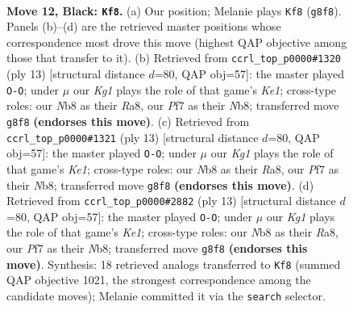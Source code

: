 \documentclass[11pt]{article}
\begin{document}
\clearpage

\begin{figure}[p]\centering
\begin{subfigure}{0.46\textwidth}\centering
\resizebox{\linewidth}{!}{%
\newchessgame
\chessboard[
  setfen={rnb1r1k1/pp1qnppp/4p2P/2PpP3/5PP1/P1P5/2P5/R1BQKBNR b KQ - 0 12},
  showmover=false,
  pgfstyle=straightmove, color=movearrow, markmove={g8-f8}
]}
\caption{}
\end{subfigure}\hfill
\begin{subfigure}{0.46\textwidth}\centering
\resizebox{\linewidth}{!}{%
\newchessgame
\chessboard[
  setfen={rnbqk2r/pp2nppp/4p3/2ppP3/3P2Q1/P1P5/2P2PPP/R1B1KBNR b KQkq - 2 7},
  showmover=false,
  pgfstyle=straightmove, color=movearrow, markmove={e8-g8}
]}
\caption{}
\end{subfigure}
\\[4pt]
\begin{subfigure}{0.46\textwidth}\centering
\resizebox{\linewidth}{!}{%
\newchessgame
\chessboard[
  setfen={rnbqk2r/pp2nppp/4p3/2ppP3/3P2Q1/P1P5/2P2PPP/R1B1KBNR b KQkq - 2 7},
  showmover=false,
  pgfstyle=straightmove, color=movearrow, markmove={e8-g8}
]}
\caption{}
\end{subfigure}\hfill
\begin{subfigure}{0.46\textwidth}\centering
\resizebox{\linewidth}{!}{%
\newchessgame
\chessboard[
  setfen={rnbqk2r/pp2nppp/4p3/2ppP3/3P2Q1/P1P5/2P2PPP/R1B1KBNR b KQkq - 2 7},
  showmover=false,
  pgfstyle=straightmove, color=movearrow, markmove={e8-g8}
]}
\caption{}
\end{subfigure}
\caption{\textbf{Move 12, Black: \texttt{Kf8}.} (a) Our position; Melanie plays \texttt{Kf8} (\texttt{g8f8}). Panels (b)--(d) are the retrieved master positions whose correspondence most drove this move (highest QAP objective among those that transfer to it). (b) Retrieved from \texttt{ccrl\_top\_p0000\#1320} (ply 13) [structural distance $d$=80, QAP obj=57]: the master played \texttt{O-O}; under $\mu$ our \emph{Kg1} plays the role of that game's \emph{Ke1}; cross-type roles: our \emph{N}b8 as their \emph{R}a8, our \emph{P}f7 as their \emph{N}b8; transferred move \texttt{g8f8} \textbf{(endorses this move)}. (c) Retrieved from \texttt{ccrl\_top\_p0000\#1321} (ply 13) [structural distance $d$=80, QAP obj=57]: the master played \texttt{O-O}; under $\mu$ our \emph{Kg1} plays the role of that game's \emph{Ke1}; cross-type roles: our \emph{N}b8 as their \emph{R}a8, our \emph{P}f7 as their \emph{N}b8; transferred move \texttt{g8f8} \textbf{(endorses this move)}. (d) Retrieved from \texttt{ccrl\_top\_p0000\#2882} (ply 13) [structural distance $d$=80, QAP obj=57]: the master played \texttt{O-O}; under $\mu$ our \emph{Kg1} plays the role of that game's \emph{Ke1}; cross-type roles: our \emph{N}b8 as their \emph{R}a8, our \emph{P}f7 as their \emph{N}b8; transferred move \texttt{g8f8} \textbf{(endorses this move)}. Synthesis: 18 retrieved analogs transferred to \texttt{Kf8} (summed QAP objective 1021, the strongest correspondence among the candidate moves); Melanie committed it via the \texttt{search} selector.}
\label{fig:thought-m23}
\end{figure}
\end{document}

